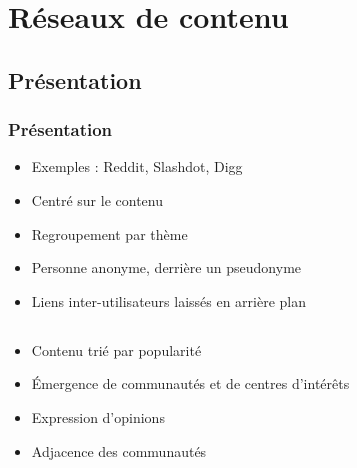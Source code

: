     \section{Réseaux de contenu}

\subsection{Présentation}
\begin{frame}
\frametitle{Présentation}
\begin{itemize}
    \itemsep1em
    \item Exemples : Reddit, Slashdot, Digg
    \item Centré sur le contenu
    \item Regroupement par thème
    \item Personne anonyme, derrière un pseudonyme
    \item Liens inter-utilisateurs laissés en arrière plan
\end{itemize}
\end{frame}

\subsection{}
\begin{frame}
\frametitle{}
\begin{itemize}
    \itemsep1em
    \item Contenu trié par popularité
    \item Émergence de communautés et de centres d'intérêts
    \item Expression d'opinions
    \item Adjacence des communautés
\end{itemize}
\end{frame}
